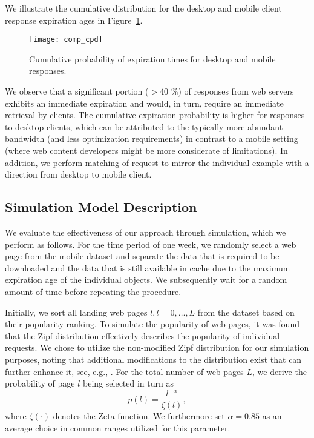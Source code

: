 We illustrate the cumulative distribution for the desktop and mobile client response expiration ages in Figure~\ref{fig:comp_cpd}.
\begin{figure}
\centering
\texttt{[image: comp\_cpd]}
	\caption{Cumulative probability of expiration times for desktop and mobile responses.}
\label{fig:comp_cpd}
\end{figure}

We observe that a significant portion ($>40$ \%) of responses from web servers exhibits an immediate expiration and would, in turn, require an immediate retrieval by clients.
The cumulative expiration probability is higher for responses to desktop clients, which can be attributed to the typically more abundant bandwidth (and less optimization requirements) in contrast to a mobile setting (where web content developers might be more considerate of limitations).
In addition, we perform matching of request to mirror the individual example with a direction from desktop to mobile client. 

\subsection{Simulation Model Description}
We evaluate the effectiveness of our approach through simulation, which we perform as follows.
For the time period of one week, we randomly select a web page from the mobile dataset and separate the data that is required to be downloaded and the data that is still available in cache due to the maximum expiration age of the individual objects. 
We subsequently wait for a random amount of time before repeating the procedure.

Initially, we sort all landing web pages $l, l=0,\ldots,L$ from the 
dataset based on their popularity ranking.
To simulate the popularity of web pages, it was found that the Zipf distribution effectively describes the popularity of individual requests.
We chose to utilize the non-modified Zipf distribution for our simulation purposes, noting that additional modifications to the distribution exist that can further enhance it, see, e.g., \cite{KrTeSh06}.
For the total number of web pages $L$, we derive the probability of page $l$ being selected in turn as
\begin{equation}
p(l)=\frac{l^{-\alpha}}{\zeta(l)},
\end{equation}
where $\zeta(\cdot)$ denotes the Zeta function. 
We furthermore set $\alpha=0.85$ as an average choice in common ranges utilized for this parameter.

